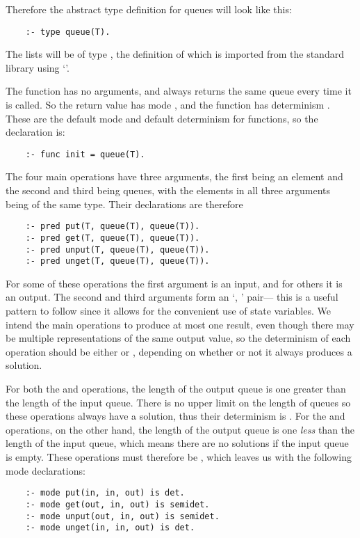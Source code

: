 Therefore the abstract type definition for queues
will look like this:
\begin{verbatim}
    :- type queue(T).
\end{verbatim}
The lists will be of type ,
the definition of which is imported from the standard library
using `'.

The  function has no arguments,
and always returns the same queue every time it is called.
So the return value has mode ,
and the function has determinism .
These are the default mode and default determinism for functions,
so the declaration is:
\begin{verbatim}
    :- func init = queue(T).
\end{verbatim}

The four main operations have three arguments,
the first being an element and the second and third being queues,
with the elements in all three arguments being of the same type.
Their  declarations are therefore
\begin{verbatim}
    :- pred put(T, queue(T), queue(T)).
    :- pred get(T, queue(T), queue(T)).
    :- pred unput(T, queue(T), queue(T)).
    :- pred unget(T, queue(T), queue(T)).
\end{verbatim}
For some of these operations the first argument is an input,
and for others it is an output.
The second and third arguments
form an `, ' pair---%
this is a useful pattern to follow
since it allows for the convenient use of state variables.
We intend the main operations to produce at most one result,
even though there may be
multiple representations of the same output value,
so the determinism of each operation
should be either  or ,
depending on whether or not it always produces a solution.

For both the  and  operations,
the length of the output queue is one greater than
the length of the input queue.
There is no upper limit on the length of queues
so these operations always have a solution,
thus their determinism is .
For the  and  operations,
on the other hand,
the length of the output queue is one \emph{less} than
the length of the input queue,
which means there are no solutions if the input queue is empty.
These operations must therefore be ,
which leaves us with the following mode declarations:
\begin{verbatim}
    :- mode put(in, in, out) is det.
    :- mode get(out, in, out) is semidet.
    :- mode unput(out, in, out) is semidet.
    :- mode unget(in, in, out) is det.
\end{verbatim}

